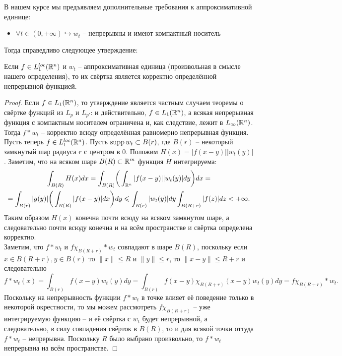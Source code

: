 \begin{note}
    В нашем курсе мы предъявляем дополнительные требования к аппроксимативной единице:
    \begin{itemize}
        \item $\forall t \in (0, +\infty) \hookrightarrow w_t$ -- непрерывны и имеют компактный носитель
    \end{itemize}
    Тогда справедливо следующее утверждение:
    \begin{theorem}
        Если $f \in L_1^{loc}(\mathbb{R}^n)$ и $w_t$ -- аппроксимативная единица (произвольная в смысле нашего определения), то их свёртка является корректно определённой непрерывной функцией.
    \end{theorem}
    \begin{proof}
        Если $f \in L_1(\mathbb{R}^n)$, то утверждение является частным случаем теоремы о свёртке функций из $L_p$ и $L_{p'}$: и действительно, $f \in L_1(\mathbb{R}^n)$, а всякая непрерывная функция с компактным носителем ограничена и, как следствие, лежит в $L_{\infty}(\mathbb{R}^n)$.
        Тогда $f * w_t$ -- корректно всюду определённая равномерно непрерывная функция. \\
        Пусть теперь $f \in L_1^{loc}(\mathbb{R}^n)$.
        Пусть $\operatorname{supp} w_t \subset B(r)$, где $B(r)$ -- некоторый замкнутый шар радиуса $r$ с центром в 0.
        Положим $H(x) = |f(x - y)||w_t(y)|$.
        Заметим, что на всяком шаре $B(R) \subset \mathbb{R}^{m}$ функция $H$ интегрируема:
        \begin{multline*}
            \int_{B(R)} H(x)dx = \int_{B(R)} \biggr(\int_{\mathbb{R}^n}|f(x - y)||w_t(y)|dy\biggr)dx = \\ = \int_{B(r)} |g(y)| \biggr(\int_{B(R)} |f(x - y)|dx \biggr) dy \leqslant \int_{B(r)} |w_t(y)|dy \int_{B(R + r)} |f(z)|dz < +\infty.
        \end{multline*}
        Таким образом $H(x)$ конечна почти всюду на всяком замкнутом шаре, а следовательно почти всюду конечна и на всём пространстве и свёртка определена корректно. \\
        Заметим, что $f * w_t$ и $f\chi_{B(R + r)} * w_t$ совпадают в шаре $B(R)$, поскольку если $x \in B(R + r), y \in B(r)$ то $\|x\| \leq R$ и $\|y\| \leq r$, то $\|x - y\| \leq R + r$ и следовательно
        \[
            f * w_t(x) = \int_{B(r)} f(x - y)w_t(y)dy = \int_{B(r)} f(x - y)\chi_{B(R + r)}(x - y)w_t(y)dy = f\chi_{B(R + r)} * w_t.
        \]
        Поскольку на непрерывность функции $f * w_t$ в точке влияет её поведение только в некоторой окрестности, то мы можем рассмотреть $f\chi_{B(R + r)}$ -- уже интегрируемую функцию -- и её свёртка с $w_t$ будет непрерывной, а следовательно, в силу совпадения свёрток в $B(R)$, то и для всякой точки оттуда $f * w_t$ -- непрерывна.
        Поскольку $R$ было выбрано произвольно, то $f * w_t$ непрерывна на всём пространстве.
    \end{proof}
\end{note}
